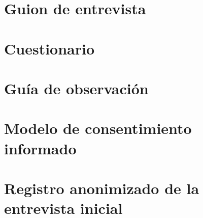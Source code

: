 \documentclass[11pt,a4paper]{article}
\begin{document}
\tableofcontents
\listoffigures
\listoftables
\clearpage











\clearpage



\clearpage
\appendix
\section{Guion de entrevista}\label{anx:entrevista}


\clearpage
\section{Cuestionario}\label{anx:cuestionario}


\clearpage
\section{Gu\'ia de observaci\'on}\label{anx:observacion}


\clearpage
\section{Modelo de consentimiento informado}\label{anx:consentimiento}


\clearpage
\section{Registro anonimizado de la entrevista inicial}
\label{anx:registro-entrevista}

\end{document}
